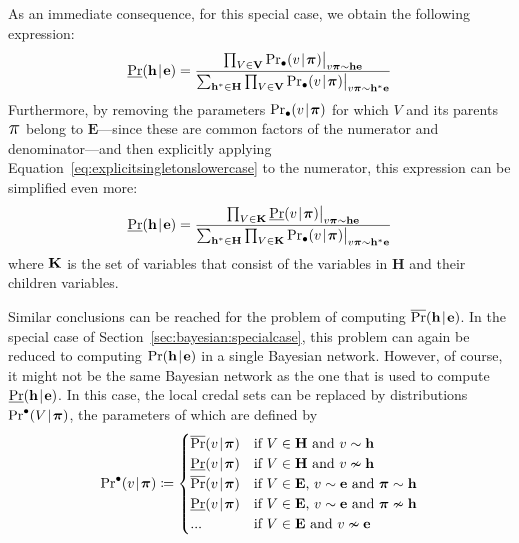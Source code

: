 \documentclass[10pt,a4paper]{paper}
\theoremstyle{definition}
\newcommand{\vbpi}{\boldsymbol\pi}
\newcommand{\vpi}{\scalebox{1.4}{\ensuremath\pi}}
\newcommand{\hyp}{\mathbf{h}}
\newcommand{\ev}{\mathbf{e}}
\newcommand{\hyps}{\mathbf{H}}
\newcommand{\evs}{\mathbf{E}}
\newcommand{\giv}[1]{\big\vert_{#1}}
\newcommand{\newmid}{\hspace{0.9pt}\vert\hspace{0.9pt}}
\begin{document}
As an immediate consequence, for this special case, we obtain the following expression:
\begin{align*}
\underline{\Pr}(\hyp\newmid\ev)
=\frac
{\prod_{V\in{\bf V}}{\Pr}_{\bullet}(v\newmid\vbpi)\giv{v\vbpi\sim \hyp\ev}}
{\sum_{\hyp^*\in\hyps}\prod_{V\in{\bf V}}{\Pr}_{\bullet}(v\newmid\vbpi)\giv{v\vbpi\sim \hyp^*\ev}}%
\end{align*}
Furthermore, by removing the parameters ${\Pr}_{\bullet}(v\newmid\vbpi)$ for which $V$ and its parents $\vpi$ belong to $\evs$---since these are common factors of the numerator and denominator---and then explicitly applying Equation~\eqref{eq:explicitsingletonslowercase} to the numerator, this expression can be simplified even more:
\vspace{-6pt}
\begin{equation*}
\underline{\Pr}(\hyp\newmid\ev)
=
\frac
{\prod_{V\in{\bf K}}\underline{\Pr}(v\newmid\vbpi)\giv{v\vbpi\sim \hyp\ev}}
{\sum_{\hyp^*\in\hyps}\prod_{V\in{\bf K}}{\Pr}_{\bullet}(v\newmid\vbpi)\giv{v\vbpi\sim \hyp^*\ev}}
\vspace{2pt}
\end{equation*}
where ${\bf K}$ is the set of variables that consist of the variables in $\hyps$ and their children variables.

Similar conclusions can be reached for the problem of computing $\overline{\Pr}(\hyp\newmid\ev)$. In the special case of Section~\ref{sec:bayesian:specialcase}, this problem can again be reduced to computing $\Pr(\hyp\newmid\ev)$ in a single Bayesian network. 
However, of course, it might not be the same Bayesian network as the one that is used to compute $\underline{\Pr}(\hyp\newmid\ev)$. In this case, the local credal sets can be replaced by distributions ${\Pr}^{\bullet}(V\newmid\vbpi)$, the parameters of which are defined by
\begin{equation*}
{\Pr}^{\bullet}(v\newmid\vbpi)
\coloneqq
\begin{cases}
\overline{\Pr}(v\newmid\vbpi) &\text{if~$V\in\hyps$ and $v\sim\hyp$}\\
\underline{\Pr}(v\newmid\vbpi) &\text{if~$V\in\hyps$ and $v\nsim\hyp$}\\
\overline{\Pr}(v\newmid\vbpi) &\text{if~$V\in\evs$, $v\sim\ev$ and $\vbpi\sim\hyp$}\\
\underline{\Pr}(v\newmid\vbpi) &\text{if~$V\in\evs$, $v\sim\ev$ and $\vbpi\nsim\hyp$}\\
$...$ &\text{if~$V\in\evs$ and $v\nsim\ev$}
\end{cases}
\vspace{2pt}
\end{equation*}
\end{document}
